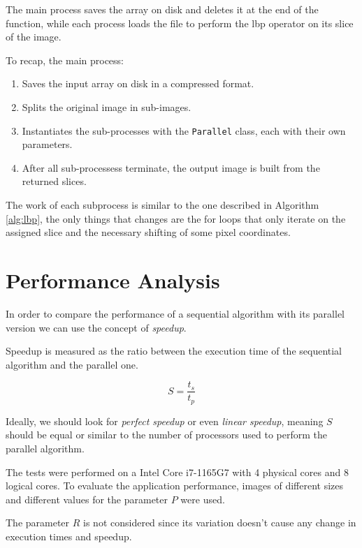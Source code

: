 \documentclass[10pt,twocolumn,letterpaper]{article}
\begin{document}
The main process saves the array on disk and deletes it at the end of the function, while each process loads the file to perform the lbp operator on its slice of the image. 

To recap, the main process:

\begin{enumerate}
	\item Saves the input array on disk in a compressed format.
	\item Splits the original image in sub-images.
	\item Instantiates the sub-processes with the \verb"Parallel" class, each with their own parameters.
	\item After all sub-processess terminate, the output image is built from the returned slices.
\end{enumerate}

The work of each subprocess is similar to the one described in Algorithm \ref{alg:lbp}, the only things that changes are the for loops that only iterate on the assigned slice and the necessary shifting of some pixel coordinates. 

\section{Performance Analysis}
In order to compare the performance of a sequential algorithm with its parallel version we can use the concept of \textit{speedup}.

Speedup is measured as the ratio between the execution time of the sequential algorithm and the parallel one.

\[S = \frac{t_s}{t_p}\]

Ideally, we should look for \textit{perfect speedup} or even \textit{linear speedup}, meaning $S$ should be equal or similar to the number of processors used to perform the parallel algorithm.

The tests were performed on a Intel Core i7-1165G7 with 4 physical cores and 8 logical cores. To evaluate the application performance, images of different sizes and different values for the parameter $P$ were used.

The parameter $R$ is not considered since its variation doesn't cause any change in execution times and speedup.
\end{document}
